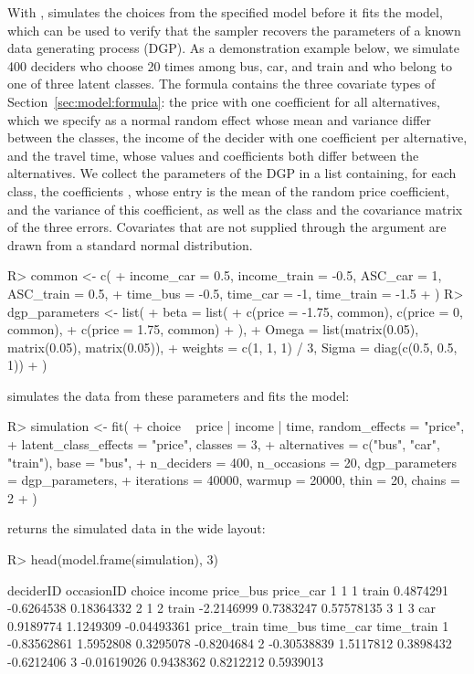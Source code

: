 \documentclass[article,shortnames]{jss}
\newcommand{\fct}[1]{\code{#1()}}
\begin{document}
With , \fct{fit} simulates the choices from the specified
model before it fits the model, which can be used to verify that the sampler
recovers the parameters of a known data generating process (DGP). As a
demonstration example below, we simulate 400 deciders who choose 20 times among
bus, car, and train and who belong to one of three latent classes. The formula
contains the three covariate types of Section~\ref{sec:model:formula}: the price
with one coefficient for all alternatives, which we specify as a normal random
effect whose mean and variance differ between the classes, the income of the
decider with one coefficient per alternative, and the travel time, whose values
and coefficients both differ between the alternatives. We collect the parameters
of the DGP in a list containing, for each class, the coefficients ,
whose entry  is the mean of the random price coefficient, and the
variance  of this coefficient, as well as the class 
and the covariance matrix  of the three errors. Covariates that are
not supplied through the argument  are drawn from a standard
normal distribution.
%
\begin{Schunk}
\begin{Sinput}
R> common <- c(
+    income_car = 0.5, income_train = -0.5, ASC_car = 1, ASC_train = 0.5,
+    time_bus = -0.5, time_car = -1, time_train = -1.5
+  )
R> dgp_parameters <- list(
+    beta = list(
+      c(price = -1.75, common), c(price = 0, common),
+      c(price = 1.75, common)
+    ),
+    Omega = list(matrix(0.05), matrix(0.05), matrix(0.05)),
+    weights = c(1, 1, 1) / 3, Sigma = diag(c(0.5, 0.5, 1))
+  )
\end{Sinput}
\end{Schunk}
%
\fct{fit} simulates the data from these parameters and fits the model:
%
\begin{Schunk}
\begin{Sinput}
R> simulation <- fit(
+    choice ~ price | income | time, random_effects = "price",
+    latent_class_effects = "price", classes = 3,
+    alternatives = c("bus", "car", "train"), base = "bus",
+    n_deciders = 400, n_occasions = 20, dgp_parameters = dgp_parameters,
+    iterations = 40000, warmup = 20000, thin = 20, chains = 2
+  )
\end{Sinput}
\end{Schunk}
%
\fct{model.frame} returns the simulated data in the wide layout:
%
\begin{Schunk}
\begin{Sinput}
R> head(model.frame(simulation), 3)
\end{Sinput}
\begin{Soutput}
  deciderID occasionID choice     income  price_bus   price_car
1         1          1  train  0.4874291 -0.6264538  0.18364332
2         1          2  train -2.2146999  0.7383247  0.57578135
3         1          3    car  0.9189774  1.1249309 -0.04493361
  price_train  time_bus  time_car time_train
1 -0.83562861 1.5952808 0.3295078 -0.8204684
2 -0.30538839 1.5117812 0.3898432 -0.6212406
3 -0.01619026 0.9438362 0.8212212  0.5939013
\end{Soutput}
\end{Schunk}
\end{document}
